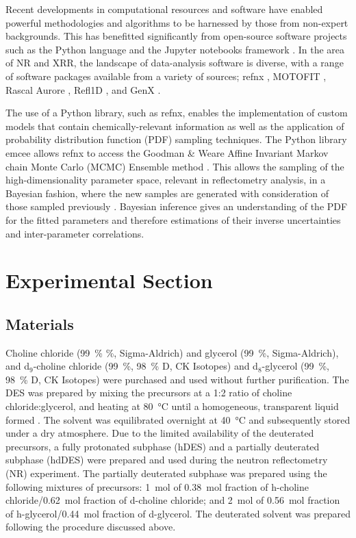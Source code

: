 \documentclass[amsmath,amssymb,twocolumn,superscriptaddress]{revtex4-1}
\begin{document}
Recent developments in computational resources and software have enabled powerful methodologies and algorithms to be harnessed by those from non-expert backgrounds.
This has benefitted significantly from open-source software projects such as the Python language \cite{van_rossum_python_1995} and the Jupyter notebooks framework \cite{kluyver_jupyter_2016}.
In the area of NR and XRR, the landscape of data-analysis software is diverse, with a range of software packages available from a variety of sources; refnx \cite{nelson_refnx_2019,nelson_refnx_2018-1}, MOTOFIT \cite{nelson_co-refinement_2006}, Rascal \cite{hughes_rascal_nodate} Aurore \cite{gerelli_aurore_2016-1}, Refl1D \cite{kienzle_refl1d_2011}, and GenX \cite{bjorck_genx_2007}.

The use of a Python library, such as refnx, enables the implementation of custom models that contain chemically-relevant information as well as the application of probability distribution function (PDF) sampling techniques.
The Python library emcee \cite{foreman-mackey_emcee_2013} allows refnx to access the Goodman \& Weare Affine Invariant Markov chain Monte Carlo (MCMC) Ensemble method \cite{goodman_ensemble_2010}.
This allows the sampling of the high-dimensionality parameter space, relevant in reflectometry analysis, in a Bayesian fashion, where the new samples are generated with consideration of those sampled previously \cite{sivia_data_2006}.
Bayesian inference gives an understanding of the PDF for the fitted parameters and therefore estimations of their inverse uncertainties and inter-parameter correlations.

\section{Experimental Section}
%
\subsection{Materials}
%
Choline chloride (\SI{99}{\percent} \%, Sigma-Aldrich) and glycerol (\SI{99}{\percent}, Sigma-Aldrich), and d$_9$-choline chloride (\SI{99}{\percent}, \SI{98}{\percent} D, CK Isotopes) and d$_8$-glycerol (\SI{99}{\percent}, \SI{98}{\percent} D, CK Isotopes) were purchased and used without further purification.
The DES was prepared by mixing the precursors at a 1:2 ratio of choline chloride:glycerol, and heating at \SI{80}{\celsius} until a homogeneous, transparent liquid formed \cite{smith_deep_2014}.
The solvent was equilibrated overnight at \SI{40}{\celsius} and subsequently stored under a dry atmosphere.
Due to the limited availability of the deuterated precursors, a fully protonated subphase (hDES) and a partially deuterated subphase (hdDES) were prepared and used during the neutron reflectometry (NR) experiment.
The partially deuterated subphase was prepared using the following mixtures of precursors: \SI{1}{\mole} of \SI{0.38}{\mole} fraction of h-choline chloride/\SI{0.62}{\mole} fraction of d-choline chloride; and \SI{2}{\mole} of \SI{0.56}{\mole} fraction of h-glycerol/\SI{0.44}{\mole} fraction of d-glycerol.
The deuterated solvent was prepared following the procedure discussed above.
\end{document}
